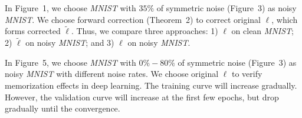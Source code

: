 In Figure~1, we choose \textit{MNIST} with $35\%$ of symmetric noise (Figure~3) as noisy \textit{MNIST}. We choose forward correction (Theorem~2) to correct original $\ell$, which forms corrected $\tilde{\ell}$. Thus, we compare three approaches: 1) $\ell$ on clean \textit{MNIST}; 2) $\tilde{\ell}$ on noisy \textit{MNIST}; and 3) $\ell$ on noisy \textit{MNIST}.

In Figure~5, we choose \textit{MNIST} with $0\%-80\%$ of symmetric noise (Figure~3) as noisy \textit{MNIST} with different noise rates. We choose original $\ell$ to verify memorization effects in deep learning. The training curve will increase gradually. However, the validation curve will increase at the first few epochs, but drop gradually until the convergence.
